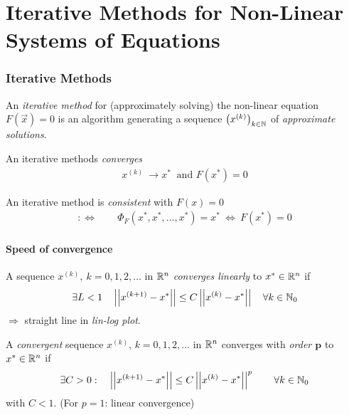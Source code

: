 \part{Iterative Methods for Non-Linear Systems of Equations}
	
\section{Iterative Methods}
	An \emph{iterative method} for (approximately solving) the non-linear equation $F(\vec x) = 0$ is an algorithm generating a sequence $\left(x^{(k)}\right)_{k\in \mathbb{N}}$ of \emph{approximate solutions}.
	
	\begin{definition}
	 An iterative methods \emph{converges} 
	 \begin{align*}
	  x^{(k)} \ \rightarrow x^* \ \text{ and } F(x^*) = 0
	 \end{align*}
	\end{definition}
	
	\begin{definition}
	 An iterative method is \emph{consistent} with $F(x) = 0$ 
	 \begin{align*}
	  :\Longleftrightarrow \qquad \Phi_F(x^*,x^*, \ldots, x^*)= x^* \ \Leftrightarrow \ F(x^*)=0
	 \end{align*}
	\end{definition}
	\subsection{Speed of convergence}
	\begin{definition}
	 A sequence $x^{(k)},\ k = 0,1,2,\ldots$ in $\mathbb{R}^n$ \emph{converges linearly} to $x^*\in \mathbb{R}^n$ if
	 \begin{align*}
	  \exists L < 1 \quad \left|\left| x^{(k+1)}-x^* \right|\right| \leq C \left|\left| x^{(k)}-x^* \right|\right| \quad \forall k \in \mathbb{N}_0
	 \end{align*}
	 $\Longrightarrow$ straight line in \emph{lin-log plot}.
	\end{definition}
	
	\begin{definition}
	 A \emph{convergent} sequence $x^{(k)}$, $k= 0, 1, 2, \ldots$ in $\mathbb{R}^n$ converges with \emph{order $\mathbf p$} to $x^*\in \mathbb{R}^n$ if
	 \begin{align*}
	  \exists C > 0: \quad \left|\left| x^{(k+1)}-x^* \right|\right| \leq C \left|\left| x^{(k)}-x^* \right|\right|^p \qquad \forall k \in \mathbb{N}_0
	 \end{align*}
	 with $C <1$. (For $p = 1$: linear convergence)
	\end{definition}

